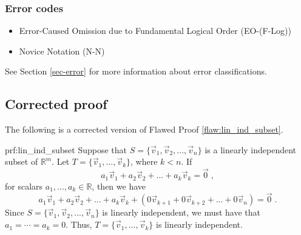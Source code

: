 \subsubsection{Error codes}
\begin{itemize}
	\item 	Error-Caused Omission due to Fundamental Logical Order (EO-(F-Log))
	\item   Novice Notation (N-N)
\end{itemize}
See Section \ref{sec-error} for more information about error classifications.

\clearpage
\subsection{Corrected proof}

The following is a corrected version of Flawed Proof \ref{flaw:lin_ind_subset}. %

\begin{prf}{prf:lin_ind_subset} %
Suppose that $ S=\{\vec{v}_1, \vec{v}_2, ..., \vec{v}_n\}$ is a linearly independent subset of $\mathbb{R}^m$. Let $T=\{\vec{v}_1,...,\vec{v}_k\}$, where $k < n$. If
$$a_1\vec{v}_1 + a_2\vec{v}_2 + ... + a_k\vec{v}_k = \vec{0}\;,$$
for scalars $a_1,..., a_k\in\mathbb{R}$, then we have
$$a_1\vec{v}_1 + a_2\vec{v}_2 + ... + a_k\vec{v}_k + (0\vec{v}_{k+1} + 0\vec{v}_{k+2} + ... + 0\vec{v}_{n}) = \vec{0}\;.$$
Since $S= \{\vec{v}_1, \vec{v}_2, ..., \vec{v}_n\}$ is linearly independent, we must have that $a_1=\cdots=a_k=0$. Thus, $T=\{\vec{v}_1,...,\vec{v}_k\}$ is linearly independent.
\end{prf} 
